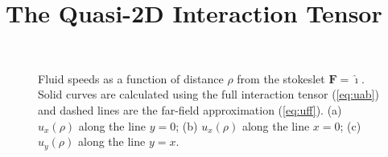 \documentclass[11pt]{ucthesis}
\begin{document}

\section{The Quasi-2D Interaction Tensor}
\label{app:2Dint}
\begin{figure}
\centering
{}
\ \\
\caption{Fluid speeds as a function of distance $\rho$ from the stokeslet $\mathbf{F} = \hat \imath$. Solid curves are calculated using the full interaction tensor (\ref{eq:uab}) and dashed lines are the far-field approximation (\ref{eq:uff}). (a) $u_x(\rho)$ along the line $y=0$; (b) $u_x(\rho)$ along the line $x=0$; (c) $u_y(\rho)$ along the line $y=x$. \label{fig:oseen}}
\end{figure}
\end{document}
